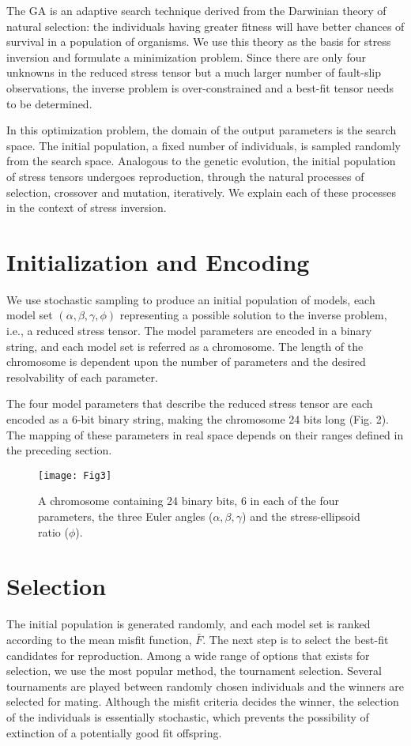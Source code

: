 \onehalfspacing
The GA is an adaptive search technique derived from the Darwinian theory of natural selection: the individuals having greater fitness will have better chances of survival in a population of organisms. We use this theory as the basis for stress inversion and formulate a minimization problem. Since there are only four unknowns in the reduced stress tensor but a much larger number of fault-slip observations, the inverse problem is over-constrained and a best-fit tensor needs to be determined.

In this optimization problem, the domain of the output parameters is the search space. The initial population, a fixed number of individuals, is sampled randomly from the search space. Analogous to the genetic evolution, the initial population of stress tensors undergoes reproduction, through the natural processes of selection, crossover and mutation, iteratively. We explain each of these processes in the context of stress inversion.

\section{Initialization and Encoding}
We use stochastic sampling to produce an initial population of models, each model set $(\alpha, \beta, \gamma, \phi)$ representing a possible solution to the inverse problem, i.e., a reduced stress tensor. The model parameters are encoded in a binary string, and each model set is referred as a chromosome. The length of the chromosome is dependent upon the number of parameters and the desired resolvability of each parameter.

The four model parameters that describe the reduced stress tensor are each encoded as a 6-bit binary string, making the chromosome 24 bits long (Fig. 2). The mapping of these parameters in real space depends on their ranges defined in the preceding section.

\begin{figure}[h]
\centering
\texttt{[image: Fig3]}
\caption{A chromosome containing 24 binary bits, 6 in each of the four parameters, the three Euler angles ($\alpha, \beta, \gamma$) and the stress-ellipsoid ratio ($\phi$).}
\label{fig3}
\end{figure}

\section{Selection}
The initial population is generated randomly, and each model set is ranked according to the mean misfit function, $\bar{F}$. The next step is to select the best-fit candidates for reproduction. Among a wide range of options that exists for selection, we use the most popular method, the tournament selection. Several tournaments are played between randomly chosen individuals and the winners are selected for mating. Although the misfit criteria decides the winner, the selection of the individuals is essentially stochastic, which prevents the possibility of extinction of a potentially good fit offspring.

